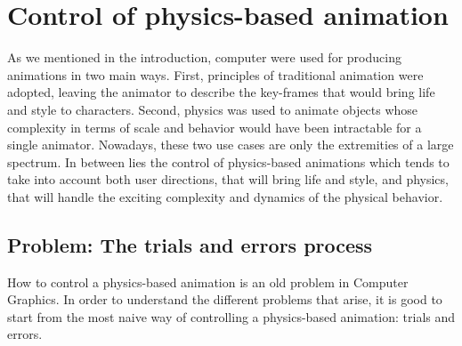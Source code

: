 \section{Control of physics-based animation}

As we mentioned in the introduction, computer were used for producing animations in two main ways. 
First, principles of traditional animation were adopted, leaving the animator to describe the key-frames that would bring life and style to characters. 
Second, physics was used to animate objects whose complexity in terms of scale and behavior would have been intractable for a single animator. 
Nowadays, these two use cases are only the extremities of a large spectrum. 
In between lies the control of physics-based animations which tends to take into account both user directions, that will bring life and style, and physics, that will handle the exciting complexity and dynamics of the physical behavior.

\subsection{Problem: The trials and errors process}

How to control a physics-based animation is an old problem in Computer Graphics. In order to understand the different problems that arise, it is good to start from the most naive way of controlling a physics-based animation: trials and errors. 

